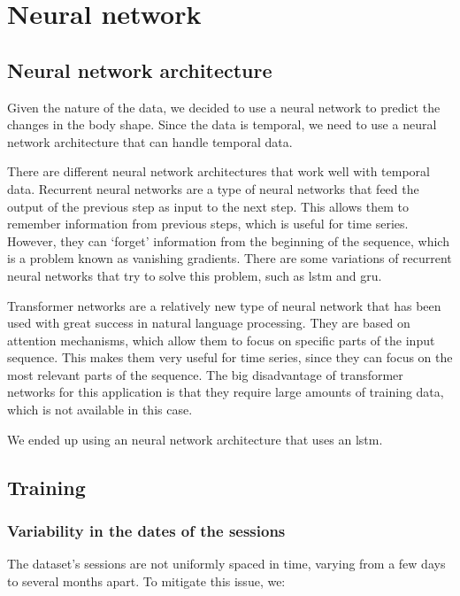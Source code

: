 \chapter{Neural network}\label{nn}

\section{Neural network architecture}

Given the nature of the data, we decided to use a neural network to predict the
changes in the body shape. Since the data is temporal, we need to use a neural
network architecture that can handle temporal data.

There are different neural network architectures that work well with temporal
data. Recurrent neural networks are a type of neural networks that feed the
output of the previous step as input to the next step. This allows them to
remember information from previous steps, which is useful for time series.
However, they can `forget' information from the beginning of the sequence,
which is a problem known as vanishing gradients. There are some variations of
recurrent neural networks that try to solve this problem, such as \gls{lstm}
and \gls{gru}.

Transformer networks are a relatively new type of neural network that has been
used with great success in natural language processing. They are based on
attention mechanisms, which allow them to focus on specific parts of the input
sequence. This makes them very useful for time series, since they can focus on
the most relevant parts of the sequence. The big disadvantage of transformer
networks for this application is that they require large amounts of training
data, which is not available in this case.

We ended up using an neural network architecture that uses an \gls{lstm}.

\section{Training}

\subsection{Variability in the dates of the sessions}

The dataset's sessions are not uniformly spaced in time, varying from a few
days to several months apart. To mitigate this issue, we:

